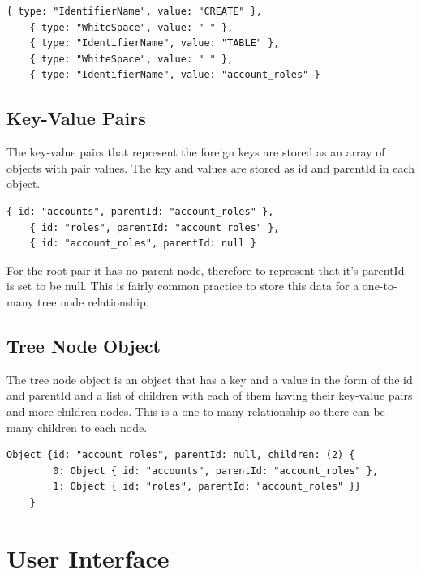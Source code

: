 \begin{lstlisting}[style=JavaScript, caption={Tokenised array of tokens from a part of a simple input of an "CREATE TABLE" statement.}]
	{ type: "IdentifierName", value: "CREATE" },
	{ type: "WhiteSpace", value: " " },
	{ type: "IdentifierName", value: "TABLE" },
	{ type: "WhiteSpace", value: " " },
	{ type: "IdentifierName", value: "account_roles" }
\end{lstlisting}

\subsection{Key-Value Pairs}

The key-value pairs that represent the foreign keys are stored as an array of objects with pair values. The key and values are stored as id and parentId in each object.

 \begin{lstlisting}[style=JavaScript, caption={Representation of the array of objects containing the key-value pairs.}]
	{ id: "accounts", parentId: "account_roles" },
	{ id: "roles", parentId: "account_roles" },
	{ id: "account_roles", parentId: null }
\end{lstlisting}

For the root pair it has no parent node, therefore to represent that it's parentId is set to be null. This is fairly common practice to store this data for a one-to-many tree node relationship.

\subsection{Tree Node Object}

The tree node object is an object that has a key and a value in the form of the id and parentId and a list of children with each of them having their key-value pairs and more children nodes. This is a one-to-many relationship so there can be many children to each node.

 \begin{lstlisting}[style=JavaScript, caption={}]
 	Object {id: "account_roles", parentId: null, children: (2) {
 		0: Object { id: "accounts", parentId: "account_roles" },
 		1: Object { id: "roles", parentId: "account_roles" }}
 	}
\end{lstlisting}

\newpage

\section{User Interface}

